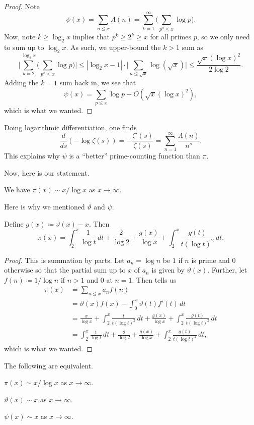 \documentclass[../notes.tex]{subfiles}
\begin{document}
\begin{proof}
	Note
	\[\psi(x)=\sum_{n\le x}\Lambda(n)=\sum_{k=1}^\infty\Bigg(\sum_{p^k\le x}\log p\Bigg).\]
	Now, note $k\ge\log_2x$ implies that $p^k\ge2^k\ge x$ for all primes $p$, so we only need to sum up to $\log_2x$. As such, we upper-bound the $k>1$ sum as
	\[\Bigg|\sum_{k=2}^{\log_2x}\Bigg(\sum_{p^k\le x}\log p\Bigg)\Bigg|\le|\log_2x-1|\cdot\Bigg|\sum_{n\le\sqrt x}\log(\sqrt x)\Bigg|\le\frac{\sqrt x(\log x)^2}{2\log2}.\]
	Adding the $k=1$ sum back in, we see that
	\[\psi(x)=\sum_{p\le x}\log p+O\left(\sqrt x(\log x)^2\right),\]
	which is what we wanted.
\end{proof}
\begin{remark}
	Doing logarithmic differentiation, one finds
	\[\frac d{ds}(-\log\zeta(s))=-\frac{\zeta'(s)}{\zeta(s)}=\sum_{n=1}^\infty\frac{\Lambda(n)}{n^s}.\]
	This explains why $\psi$ is a ``better'' prime-counting function than $\pi$.
\end{remark}
Now, here is our statement.
\begin{theorem}
	We have $\pi(x)\sim x/\log x$ as $x\to\infty$.
\end{theorem}
Here is why we mentioned $\vartheta$ and $\psi$.
\begin{lemma} \label{lem:get-pi-error}
	Define $g(x)\coloneqq\vartheta(x)-x$. Then
	\[\pi(x)=\int_2^x\frac1{\log t}\,dt+\frac2{\log2}+\frac{g(x)}{\log x}+\int_2^x\frac{g(t)}{t(\log t)^2}\,dt.\]
\end{lemma}
\begin{proof}
	This is summation by parts. Let $a_n=\log n$ be $1$ if $n$ is prime and $0$ otherwise so that the partial sum up to $x$ of $a_n$ is given by $\vartheta(x)$. Further, let $f(n)\coloneqq1/\log n$ if $n>1$ and $0$ at $n=1$. Then  tells us
	\begin{align*}
		\pi(x) &= \sum_{n\le x}a_nf(n) \\
		&= \vartheta(x)f(x)-\int_0^x\vartheta(t)f'(t)\,dt \\
		&= \frac{x}{\log x}+\int_2^x\frac{t}{t(\log t)^2}\,dt+\frac{g(x)}{\log x}+\int_2^x\frac{g(t)}{t(\log t)^2}\,dt \\
		&= \int_2^x\frac1{\log t}\,dt+\frac2{\log2}+\frac{g(x)}{\log x}+\int_2^x\frac{g(t)}{t(\log t)^2}\,dt,
	\end{align*}
	which is what we wanted.
\end{proof}
\begin{proposition}
	The following are equivalent.
	\begin{listalph}
		\item $\pi(x)\sim x/\log x$ as $x\to\infty$.
		\item $\vartheta(x)\sim x$ as $x\to\infty$.
		\item $\psi(x)\sim x$ as $x\to\infty$.
	\end{listalph}
\end{proposition}
\end{document}
